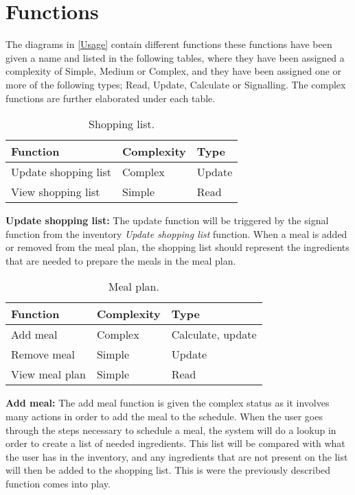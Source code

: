 \section{Functions}\label{Functions}
The diagrams in \cref{Usage} contain different functions these functions have been given a name and listed in the following tables, where they have been assigned a complexity of Simple, Medium or Complex, and they have been assigned one or more of the following types; Read, Update, Calculate or Signalling. The complex functions are further elaborated under each table.

\begin{table}[H]
	\centering
	\begin{tabular}{|l|l|l|}\hline	\textbf{Function}&\textbf{Complexity}&\textbf{Type}\\\hline
	  Update shopping list  &  Complex & Update \\\hline
	  View shopping list    &  Simple  & Read   \\\hline
  \end{tabular}
	\caption{Shopping list.}
\end{table}
\textbf{Update shopping list:} The update function will be triggered by the signal function from the inventory \textit{Update shopping list} function. When a meal is added or removed from the meal plan, the shopping list should represent the ingredients that are needed to prepare the meals in the meal plan.
	\begin{table}[H]
	\centering
  \begin{tabular}{|l|l|l|}\hline
		\textbf{Function}&\textbf{Complexity}&\textbf{Type}\\\hline
	  Add meal              &  Complex & Calculate, update \\\hline
	  Remove meal           &  Simple  & Update            \\\hline
	  View meal plan        &  Simple  & Read              \\\hline
	  \end{tabular}
	\caption{Meal plan.}
  \end{table}
\textbf{Add meal:} The add meal function is given the complex status as it involves many actions in order to add the meal to the schedule. When the user goes through the steps necessary to schedule a meal, the system will do a lookup in order to create a list of needed ingredients. This list will be compared with what the user has in the inventory, and any ingredients that are not present on the list will then be added to the shopping list. This is were the previously described function comes into play.
